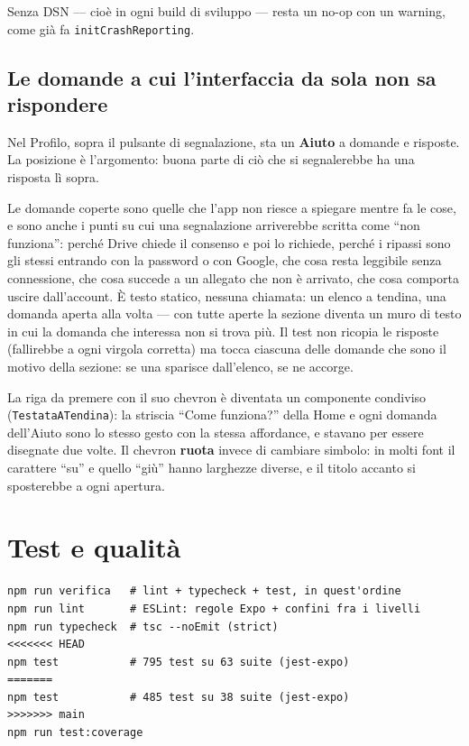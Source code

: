 \documentclass[11pt,a4paper]{report}
\begin{document}
Senza DSN --- cio\`e in ogni build di sviluppo --- resta un no-op con un
warning, come gi\`a fa \texttt{initCrashReporting}.

\section{Le domande a cui l'interfaccia da sola non sa rispondere}

Nel Profilo, sopra il pulsante di segnalazione, sta un \textbf{Aiuto} a domande
e risposte. La posizione \`e l'argomento: buona parte di ci\`o che si
segnalerebbe ha una risposta l\`i sopra.

Le domande coperte sono quelle che l'app non riesce a spiegare mentre fa le
cose, e sono anche i punti su cui una segnalazione arriverebbe scritta come
``non funziona'': perch\'e Drive chiede il consenso e poi lo richiede, perch\'e
i ripassi sono gli stessi entrando con la password o con Google, che cosa resta
leggibile senza connessione, che cosa succede a un allegato che non \`e
arrivato, che cosa comporta uscire dall'account. \`E testo statico, nessuna
chiamata: un elenco a tendina, una domanda aperta alla volta --- con tutte
aperte la sezione diventa un muro di testo in cui la domanda che interessa non
si trova pi\`u. Il test non ricopia le risposte (fallirebbe a ogni virgola
corretta) ma tocca ciascuna delle domande che sono il motivo della sezione: se
una sparisce dall'elenco, se ne accorge.

La riga da premere con il suo chevron \`e diventata un componente condiviso
(\texttt{TestataATendina}): la striscia ``Come funziona?'' della Home e ogni
domanda dell'Aiuto sono lo stesso gesto con la stessa affordance, e stavano per
essere disegnate due volte. Il chevron \textbf{ruota} invece di cambiare
simbolo: in molti font il carattere ``su'' e quello ``gi\`u'' hanno larghezze
diverse, e il titolo accanto si sposterebbe a ogni apertura.

\chapter{Test e qualit\`a}
\label{sec:test}

\begin{lstlisting}
npm run verifica   # lint + typecheck + test, in quest'ordine
npm run lint       # ESLint: regole Expo + confini fra i livelli
npm run typecheck  # tsc --noEmit (strict)
<<<<<<< HEAD
npm test           # 795 test su 63 suite (jest-expo)
=======
npm test           # 485 test su 38 suite (jest-expo)
>>>>>>> main
npm run test:coverage
\end{lstlisting}
\end{document}
